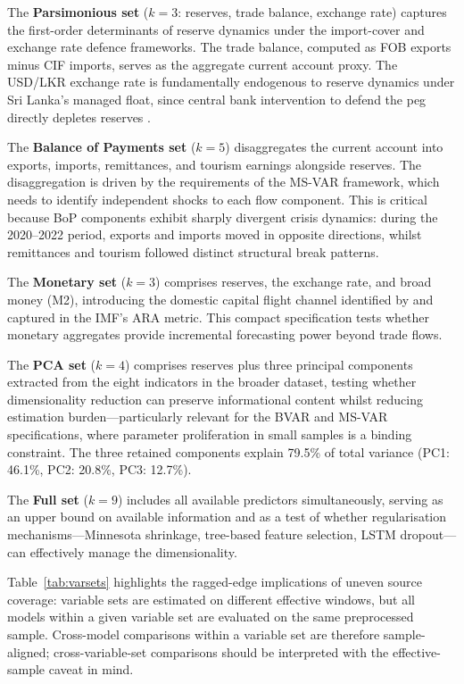 \documentclass[12pt,a4paper]{article}
\begin{document}
The \textbf{Parsimonious set} ($k=3$: reserves, trade balance, exchange rate) captures the first-order determinants of reserve dynamics under the import-cover and exchange rate defence frameworks. The trade balance, computed as FOB exports minus CIF imports, serves as the aggregate current account proxy. The USD/LKR exchange rate is fundamentally endogenous to reserve dynamics under Sri Lanka's managed float, since central bank intervention to defend the peg directly depletes reserves \citep{Obstfeld2010}.

The \textbf{Balance of Payments set} ($k=5$) disaggregates the current account into exports, imports, remittances, and tourism earnings alongside reserves. The disaggregation is driven by the requirements of the MS-VAR framework, which needs to identify independent shocks to each flow component. This is critical because BoP components exhibit sharply divergent crisis dynamics: during the 2020--2022 period, exports and imports moved in opposite directions, whilst remittances and tourism followed distinct structural break patterns.

The \textbf{Monetary set} ($k=3$) comprises reserves, the exchange rate, and broad money (M2), introducing the domestic capital flight channel identified by \cite{Obstfeld2010} and captured in the IMF's ARA metric. This compact specification tests whether monetary aggregates provide incremental forecasting power beyond trade flows.

The \textbf{PCA set} ($k=4$) comprises reserves plus three principal components extracted from the eight indicators in the broader dataset, testing whether dimensionality reduction can preserve informational content whilst reducing estimation burden---particularly relevant for the BVAR and MS-VAR specifications, where parameter proliferation in small samples is a binding constraint. The three retained components explain 79.5\% of total variance (PC1: 46.1\%, PC2: 20.8\%, PC3: 12.7\%).

The \textbf{Full set} ($k=9$) includes all available predictors simultaneously, serving as an upper bound on available information and as a test of whether regularisation mechanisms---Minnesota shrinkage, tree-based feature selection, LSTM dropout---can effectively manage the dimensionality.

Table~\ref{tab:varsets} highlights the ragged-edge implications of uneven source coverage: variable sets are estimated on different effective windows, but all models within a given variable set are evaluated on the same preprocessed sample. Cross-model comparisons within a variable set are therefore sample-aligned; cross-variable-set comparisons should be interpreted with the effective-sample caveat in mind.
\end{document}
